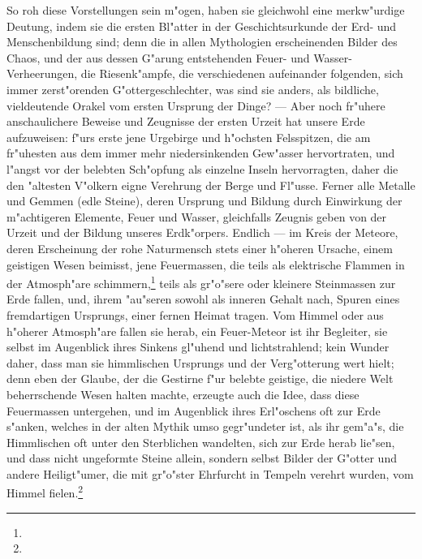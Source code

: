 \documentclass[a4paper, 11pt, oneside, polutonikogreek, german]{article}
\begin{document}
So roh diese Vorstellungen sein m"ogen, haben sie gleichwohl eine merkw"urdige Deutung, indem sie die ersten Bl"atter in der Geschichtsurkunde der Erd- und Menschenbildung sind; denn die in allen Mythologien erscheinenden Bilder des Chaos, und der aus dessen G"arung entstehenden Feuer- und Wasser-Verheerungen, die Riesenk"ampfe, die verschiedenen aufeinander folgenden, sich immer zerst"orenden G"ottergeschlechter, was sind sie anders, als bildliche, vieldeutende Orakel vom ersten Ursprung der Dinge? --- Aber noch fr"uhere anschaulichere Beweise und Zeugnisse der ersten Urzeit hat unsere Erde aufzuweisen: f"urs erste jene Urgebirge und h"ochsten Felsspitzen, die am fr"uhesten aus dem immer mehr niedersinkenden Gew"asser hervortraten, und l"angst vor der belebten Sch"opfung als einzelne Inseln hervorragten, daher die den "altesten V"olkern eigne Verehrung der Berge und Fl"usse. Ferner alle Metalle und Gemmen (edle Steine), deren Ursprung und Bildung durch Einwirkung der m"achtigeren Elemente, Feuer und Wasser, gleichfalls Zeugnis geben von der Urzeit und der Bildung unseres Erdk"orpers. Endlich --- im Kreis der Meteore, deren Erscheinung der rohe Naturmensch stets einer h"oheren Ursache, einem geistigen Wesen beimisst, jene Feuermassen, die teils als elektrische Flammen in der Atmosph"are schimmern,\footnote{} teils als gr"o"sere oder kleinere Steinmassen zur Erde fallen, und, ihrem "au"seren sowohl als inneren Gehalt nach, Spuren eines fremdartigen Ursprungs, einer fernen Heimat tragen. Vom Himmel oder aus h"oherer Atmosph"are fallen sie herab, ein Feuer-Meteor ist ihr Begleiter, sie selbst im Augenblick ihres Sinkens gl"uhend und lichtstrahlend; kein Wunder daher, dass man sie himmlischen Ursprungs und der Verg"otterung wert hielt; denn eben der Glaube, der die Gestirne f"ur belebte geistige, die niedere Welt beherrschende Wesen halten machte, erzeugte auch die Idee, dass diese Feuermassen untergehen, und im Augenblick ihres Erl"oschens oft zur Erde s"anken, welches in der alten Mythik umso gegr"undeter ist, als ihr gem"a"s, die Himmlischen oft unter den Sterblichen wandelten, sich zur Erde herab lie"sen, und dass nicht ungeformte Steine allein, sondern selbst Bilder der G"otter und andere Heiligt"umer, die mit gr"o"ster Ehrfurcht in Tempeln verehrt wurden, vom Himmel fielen.\footnote{}
\end{document}
